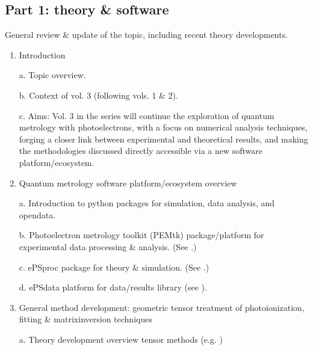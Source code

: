 \documentclass[letterpaper,table,10pt,english]{jupyterBook}
\begin{document}
\subsection{Part 1: theory \& software}
\label{\detokenize{frontmatter/overview_270122:part-1-theory-software}}
\sphinxAtStartPar
General review \& update of the topic, including recent theory developments.
\begin{enumerate}
%
\item {} 
\sphinxAtStartPar
Introduction

\sphinxAtStartPar
a.  Topic overview.

\sphinxAtStartPar
b.  Context of vol. 3 (following vols. 1 \& 2).

\sphinxAtStartPar
c.  Aims: Vol. 3 in the series will continue the exploration of quantum metrology with photoelectrons, with a focus on numerical analysis techniques, forging a closer link between experimental and theoretical results, and making the methodologies discussed directly accessible via a new software platform/ecosystem.

\item {} 
\sphinxAtStartPar
Quantum metrology software platform/ecosystem overview

\sphinxAtStartPar
a.  Introduction to python packages for simulation, data analysis, and open\sphinxhyphen{}data.

\sphinxAtStartPar
b.  Photoelectron metrology toolkit (PEMtk) package/platform for experimental data processing \& analysis. (See .)

\sphinxAtStartPar
c.  ePSproc package for theory \& simulation. (See .)

\sphinxAtStartPar
d.  ePSdata platform for data/results library (see ).

\item {} 
\sphinxAtStartPar
General method development: geometric tensor treatment of
photoionization, fitting \& matrix\sphinxhyphen{}inversion techniques

\sphinxAtStartPar
a.  Theory development overview \sphinxhyphen{} tensor methods (e.g. )


\end{enumerate}
\end{document}
